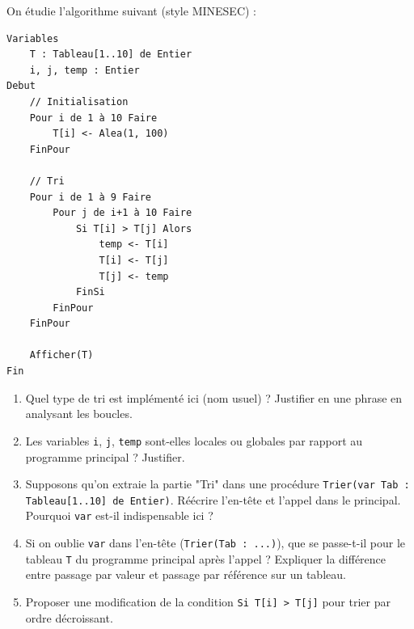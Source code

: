 \documentclass[11pt]{article}
\begin{document}
\begin{exercice}
On étudie l'algorithme suivant (style MINESEC) :
\begin{verbatim}
Variables
    T : Tableau[1..10] de Entier
    i, j, temp : Entier
Debut
    // Initialisation
    Pour i de 1 à 10 Faire
        T[i] <- Alea(1, 100)
    FinPour
    
    // Tri
    Pour i de 1 à 9 Faire
        Pour j de i+1 à 10 Faire
            Si T[i] > T[j] Alors
                temp <- T[i]
                T[i] <- T[j]
                T[j] <- temp
            FinSi
        FinPour
    FinPour
    
    Afficher(T)
Fin
\end{verbatim}
\begin{enumerate}
    \item Quel type de tri est implémenté ici (nom usuel) ? Justifier en une phrase en analysant les boucles.
    \item Les variables \texttt{i}, \texttt{j}, \texttt{temp} sont-elles locales ou globales par rapport au programme principal ? Justifier.
    \item Supposons qu'on extraie la partie "Tri" dans une procédure \texttt{Trier(var Tab : Tableau[1..10] de Entier)}. Réécrire l'en-tête et l'appel dans le principal. Pourquoi \texttt{var} est-il indispensable ici ?
    \item Si on oublie \texttt{var} dans l'en-tête (\texttt{Trier(Tab : ...)}), que se passe-t-il pour le tableau \texttt{T} du programme principal après l'appel ? Expliquer la différence entre passage par valeur et passage par référence sur un tableau.
    \item Proposer une modification de la condition \texttt{Si T[i] > T[j]} pour trier par ordre décroissant.
\end{enumerate}
\end{exercice}
\end{document}
